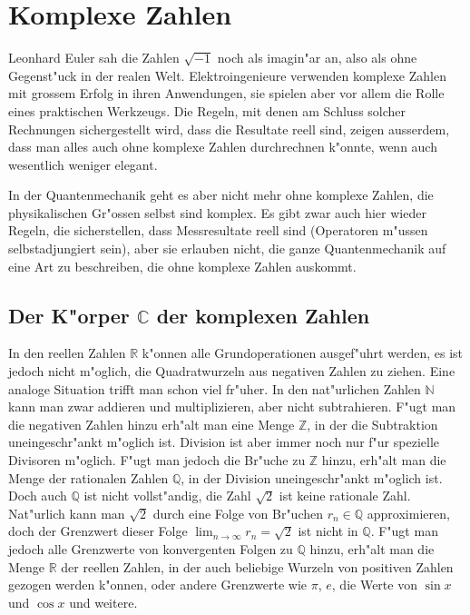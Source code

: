 \chapter{Komplexe Zahlen}
\rhead{}
Leonhard Euler sah die Zahlen $\sqrt{-1}$ noch als imagin"ar an,
also als ohne Gegenst"uck in der realen Welt.
Elektroingenieure verwenden komplexe Zahlen mit grossem Erfolg in ihren
Anwendungen, sie spielen aber vor allem die Rolle eines praktischen
Werkzeugs. Die Regeln, mit denen am Schluss solcher Rechnungen sichergestellt
wird, dass die Resultate reell sind, zeigen ausserdem, dass man alles auch
ohne komplexe Zahlen durchrechnen k"onnte, wenn auch wesentlich weniger
elegant.

In der Quantenmechanik geht es aber nicht mehr ohne komplexe Zahlen,
die physikalischen Gr"ossen selbst sind komplex. Es gibt zwar auch
hier wieder Regeln, die sicherstellen, dass Messresultate reell sind
(Operatoren m"ussen selbstadjungiert sein), aber sie erlauben nicht,
die ganze Quantenmechanik auf eine Art zu beschreiben, die ohne komplexe
Zahlen auskommt.

\section{Der K"orper \texorpdfstring{$\mathbb C$}{C} der komplexen Zahlen}
In den reellen Zahlen $\mathbb R$ k"onnen alle Grundoperationen ausgef"uhrt
werden, es ist jedoch nicht m"oglich, die Quadratwurzeln aus negativen
Zahlen zu ziehen. Eine analoge Situation trifft man schon viel fr"uher.
In den nat"urlichen Zahlen $\mathbb N$ kann man zwar addieren und
multiplizieren, aber nicht subtrahieren.
F"ugt man die negativen Zahlen hinzu erh"alt man eine Menge $\mathbb Z$,
in der die Subtraktion uneingeschr"ankt m"oglich ist. Division ist aber
immer noch nur f"ur spezielle Divisoren m"oglich. F"ugt man jedoch die
Br"uche zu $\mathbb Z$ hinzu, erh"alt man die Menge der rationalen Zahlen
$\mathbb Q$, in der Division uneingeschr"ankt m"oglich ist.
Doch auch $\mathbb Q$ ist nicht vollst"andig, die Zahl $\sqrt{2}$ ist
keine rationale Zahl. Nat"urlich kann man $\sqrt{2}$ durch eine
Folge von Br"uchen $r_n\in\mathbb Q$ approximieren, doch der Grenzwert
dieser Folge $\lim_{n\to\infty}r_n=\sqrt{2}$ ist nicht in $\mathbb Q$.
F"ugt man jedoch alle Grenzwerte von konvergenten Folgen zu $\mathbb Q$
hinzu, erh"alt man die Menge $\mathbb R$ der reellen Zahlen, in der
auch beliebige Wurzeln von positiven Zahlen gezogen werden k"onnen,
oder andere Grenzwerte wie $\pi$, $e$, die Werte von $\sin x$ und $\cos x$
und weitere.

